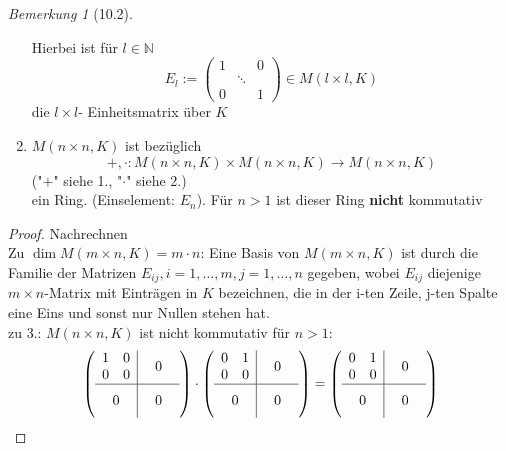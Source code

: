 \documentclass[a4paper]{scrartcl}
\theoremstyle{definition}
\theoremstyle{plain}
\theoremstyle{plain}
\theoremstyle{remark}
\newtheorem{remark}{Bemerkung}
\theoremstyle{remark}
\theoremstyle{remark}
\theoremstyle{remark}
\theoremstyle{remark}
\begin{document}
\begin{remark}[10.2]
\begin{enumerate}
\begin{itemize}
\end{itemize}
Hierbei ist für $l \in \mathbb{N}$
\[E_l := \begin{pmatrix} 1 & & 0 \\ & \ddots & \\ 0 & & 1 \end{pmatrix} \in M(l\times l, K)\]
die $l\times l$- Einheitsmatrix über $K$
\item $M(n\times n, K)$ ist bezüglich
\[+,\cdot : M(n\times n, K) \times M(n\times n, K) \to M(n\times n, K)\]
("$+$" siehe 1., "$\cdot$" siehe 2.) \\
         ein Ring. (Einselement: $E_n$). Für $n > 1$ ist dieser Ring \textbf{nicht} kommutativ
\end{enumerate}
\end{remark}
\begin{proof}
Nachrechnen \\
  Zu $\dim M(m\times n, K) = m\cdot n$: Eine Basis von $M(m\times n, K)$ ist durch die Familie der Matrizen $E_{ij}, i = 1, \ldots, m, j = 1,\ldots, n$ gegeben, wobei $E_{ij}$ diejenige $m\times n$-Matrix mit Einträgen in $K$ bezeichnen, die in der i-ten Zeile, j-ten Spalte eine Eins
und sonst nur Nullen stehen hat. \\
  zu 3.: $M(n\times n, K)$ ist nicht kommutativ für $n > 1$:
\begin{align*}
&\sbox0{$\begin{matrix} 1 & 0 \\ 0 & 0 \end{matrix}$}%
\sbox1{$\begin{matrix} 0 & 1 \\ 0 & 0 \end{matrix}$}%
\left(
\begin{array}{c|c}
\usebox{0}&\makebox[\wd0]{$0$} \\
\hline
\vphantom{\usebox{0}}\makebox[\wd0]{$0$}&\makebox[\wd0]{$0$}
\end{array}
\right)
\cdot
\left(
\begin{array}{c|c}
\usebox{1}&\makebox[\wd1]{$0$} \\
\hline
\vphantom{\usebox{1}}\makebox[\wd1]{$0$}&\makebox[\wd1]{$0$}
\end{array}
\right)
=
\left(
\begin{array}{c|c}
\usebox{1}&\makebox[\wd1]{$0$} \\
\hline
\vphantom{\usebox{1}}\makebox[\wd1]{$0$}&\makebox[\wd1]{$0$}
\end{array}
\right) \\

\end{align*}
\end{proof}
\end{document}
